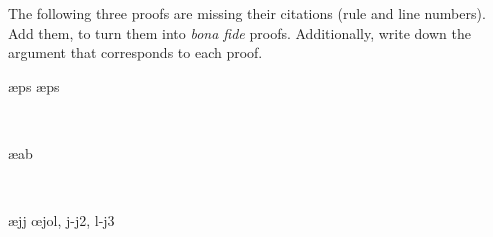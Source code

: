 \problempart
The following three proofs are missing their citations (rule and line numbers). Add them, to turn them into \textit{bona fide} proofs. Additionally, write down the argument that corresponds to each proof.
\newpage
\begin{multicols}{2}
\begin{fitchproof}
\ae{ps}
\ae{ps}
\end{fitchproof}
\\

\bigskip

\begin{fitchproof}
\open
	\ae{ab}
\close
{}
\end{fitchproof}
\\

\columnbreak

\begin{fitchproof}
\open
	\ae{jj}
\close
\open
\close
{}\oe{jol, j-j2, l-j3}
\end{fitchproof}
\\
\end{multicols}


